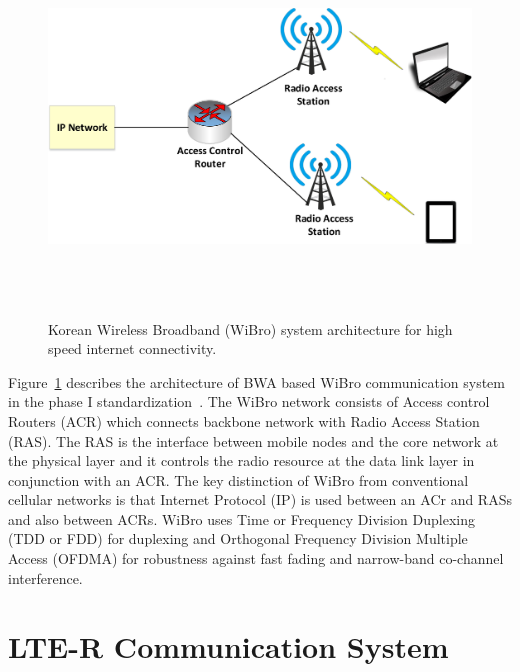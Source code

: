 \begin{figure}[!ht]
\centering
\includegraphics[width=\textwidth,height=10cm,keepaspectratio]{images/Gill/5G/wibro.eps} 
\caption{Korean Wireless Broadband (WiBro) system architecture for high speed internet connectivity.}
\label{wibro}
\end{figure}

Figure~\ref{wibro} describes the architecture of BWA based WiBro communication system in the phase I standardization~\cite{wibro}. The WiBro network consists of Access control Routers (ACR) which connects backbone network with Radio Access Station (RAS). The RAS is the interface between mobile nodes and the core network at the physical layer and it controls the radio resource at the data link layer in conjunction with an ACR. The key distinction of WiBro from conventional cellular networks is that Internet Protocol (IP) is used between an ACr and RASs and also between ACRs. WiBro uses Time or Frequency Division Duplexing (TDD or FDD) for duplexing and Orthogonal Frequency Division Multiple Access (OFDMA) for robustness against fast fading and narrow-band co-channel interference.


\section{LTE-R Communication System}

